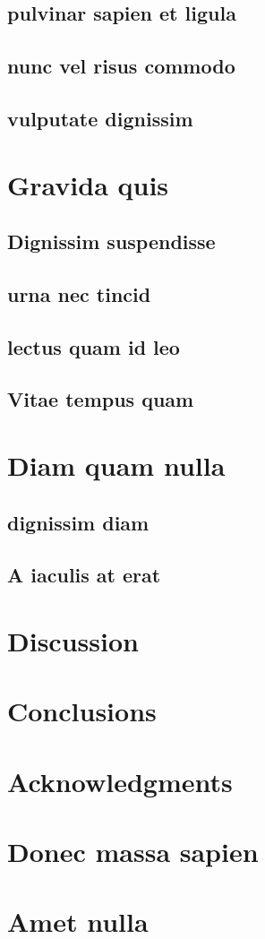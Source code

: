 \documentclass[12pt, a4paper]{article}
\numberwithin{equation}{section}
\begin{document}
\subsection{pulvinar sapien et ligula}
\subsection{nunc vel risus commodo}
\subsection{vulputate dignissim}

\section{Gravida quis}

\subsection{Dignissim suspendisse}
\subsection{urna nec tincid}
\subsection{lectus quam id leo}
\subsection{Vitae tempus quam}

\section{Diam quam nulla}

\subsection{dignissim diam}
\subsection{A iaculis at erat}

\section{Discussion}

\section{Conclusions}

\section*{Acknowledgments}

\printbibliography

\appendix
\section{Donec massa sapien}

\section{Amet nulla}
\end{document}
